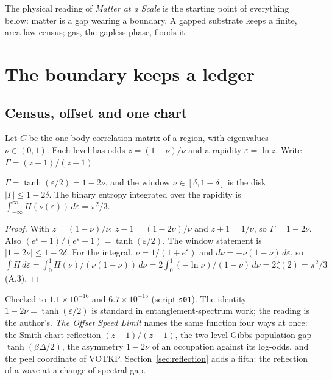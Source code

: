 The physical reading of \emph{Matter at a Scale} is the starting point of everything below: matter is a gap wearing a boundary. A gapped substrate keeps a finite, area-law census; gas, the gapless phase, floods it.

\section{The boundary keeps a ledger}\label{sec:ledger}
\subsection{Census, offset and one chart}
Let $C$ be the one-body correlation matrix of a region, with eigenvalues $\nu\in(0,1)$. Each level has odds $z=(1-\nu)/\nu$ and a rapidity $\varepsilon=\ln z$. Write $\Gamma=(z-1)/(z+1)$.

\begin{proposition} \label{prop:bridge}
$\Gamma=\tanh(\varepsilon/2)=1-2\nu$, and the window $\nu\in[\delta,1-\delta]$ is the disk $|\Gamma|\le1-2\delta$. The binary entropy integrated over the rapidity is $\int_{-\infty}^{\infty}H(\nu(\varepsilon))\,d\varepsilon=\pi^2/3$. 
\end{proposition}
\begin{proof}
With $z=(1-\nu)/\nu$: $z-1=(1-2\nu)/\nu$ and $z+1=1/\nu$, so $\Gamma=1-2\nu$. Also $(e^\varepsilon-1)/(e^\varepsilon+1)=\tanh(\varepsilon/2)$. The window statement is $|1-2\nu|\le1-2\delta$. For the integral, $\nu=1/(1+e^\varepsilon)$ and $d\nu=-\nu(1-\nu)\,d\varepsilon$, so $\int H\,d\varepsilon=\int_0^1 H(\nu)/(\nu(1-\nu))\,d\nu=2\int_0^1(-\ln\nu)/(1-\nu)\,d\nu=2\zeta(2)=\pi^2/3$ (A.3).
\end{proof}
Checked to $1.1\times10^{-16}$ and $6.7\times10^{-15}$ (script \texttt{s01}). The identity $1-2\nu=\tanh(\varepsilon/2)$ is standard in entanglement-spectrum work; the reading is the author's. \emph{The Offset Speed Limit} names the same function four ways at once: the Smith-chart reflection $(z-1)/(z+1)$, the two-level Gibbs population gap $\tanh(\beta\Delta/2)$, the asymmetry $1-2\nu$ of an occupation against its log-odds, and the peel coordinate of VOTKP. Section~\ref{sec:reflection} adds a fifth: the reflection of a wave at a change of spectral gap.

